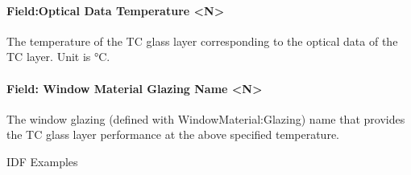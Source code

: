 \paragraph{Field:Optical Data Temperature \textless{}N\textgreater{}}\label{fieldoptical-data-temperature-n}

The temperature of the TC glass layer corresponding to the optical data of the TC layer. Unit is °C.

\paragraph{Field: Window Material Glazing Name \textless{}N\textgreater{}}\label{field-window-material-glazing-name-n}

The window glazing (defined with WindowMaterial:Glazing) name that provides the TC glass layer performance at the above specified temperature.

IDF Examples


